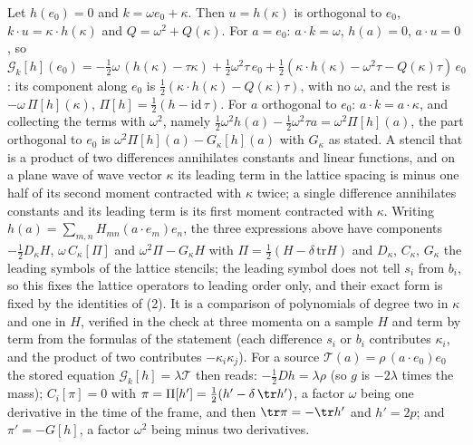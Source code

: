 Let $h(e_{0}) = 0$ and $k = \omega e_{0} + \kappa$. Then $u = h(\kappa)$ is orthogonal to $e_{0}$, $k\cdot u = \kappa\cdot h(\kappa)$ and $Q = \omega^{2} + Q(\kappa)$. For $a = e_{0}$: $a\cdot k = \omega$, $h(a) = 0$, $a\cdot u = 0$, so $\mathcal{G}_{k}[h](e_{0}) = -\tfrac12\omega\,(h(\kappa) - \tau\kappa) + \tfrac12\omega^{2}\tau\,e_{0} + \tfrac12(\kappa\cdot h(\kappa) - \omega^{2}\tau - Q(\kappa)\tau)\,e_{0}$: its component along $e_{0}$ is $\tfrac12(\kappa\cdot h(\kappa) - Q(\kappa)\tau)$, with no $\omega$, and the rest is $-\omega\,\Pi[h](\kappa)$, $\Pi[h] = \tfrac12(h - \mathrm{id}\,\tau)$. For $a$ orthogonal to $e_{0}$: $a\cdot k = a\cdot\kappa$, and collecting the terms with $\omega^{2}$, namely $\tfrac12\omega^{2}h(a) - \tfrac12\omega^{2}\tau a = \omega^{2}\Pi[h](a)$, the part orthogonal to $e_{0}$ is $\omega^{2}\Pi[h](a) - G_{\kappa}[h](a)$ with $G_{\kappa}$ as stated. A stencil that is a product of two differences annihilates constants and linear functions, and on a plane wave of wave vector $\kappa$ its leading term in the lattice spacing is minus one half of its second moment contracted with $\kappa$ twice; a single difference annihilates constants and its leading term is its first moment contracted with $\kappa$. Writing $h(a) = \sum_{m,n}H_{mn}(a\cdot e_{m})e_{n}$, the three expressions above have components $-\tfrac12 D_{\kappa}H$, $\omega\,C_{\kappa}[\Pi]$ and $\omega^{2}\Pi - G_{\kappa}H$ with $\Pi = \tfrac12(H - \delta\,\mathrm{tr}H)$ and $D_{\kappa}$, $C_{\kappa}$, $G_{\kappa}$ the leading symbols of the lattice stencils; the leading symbol does not tell $s_{i}$ from $b_{i}$, so this fixes the lattice operators to leading order only, and their exact form is fixed by the identities of (2). It is a comparison of polynomials of degree two in $\kappa$ and one in $H$, verified in the check at three momenta on a sample $H$ and term by term from the formulas of the statement (each difference $s_{i}$ or $b_{i}$ contributes $\kappa_{i}$, and the product of two contributes $-\kappa_{i}\kappa_{j}$). For a source $\mathcal{T}(a) = \rho\,(a\cdot e_{0})e_{0}$ the stored equation $\mathcal{G}_{k}[h] = \lambda\mathcal{T}$ then reads: $-\tfrac12 Dh = \lambda\rho$ (so $g$ is $-2\lambda$ times the mass); $C_{i}[\pi] = 0$ with $\pi = \Pi[h'] = \tfrac12(h' - \delta\,\tr h')$, a factor $\omega$ being one derivative in the time of the frame, and then $\tr\pi = -\tr h'$ and $h' = 2p$; and $\pi' = -G[h]$, a factor $\omega^{2}$ being minus two derivatives.

